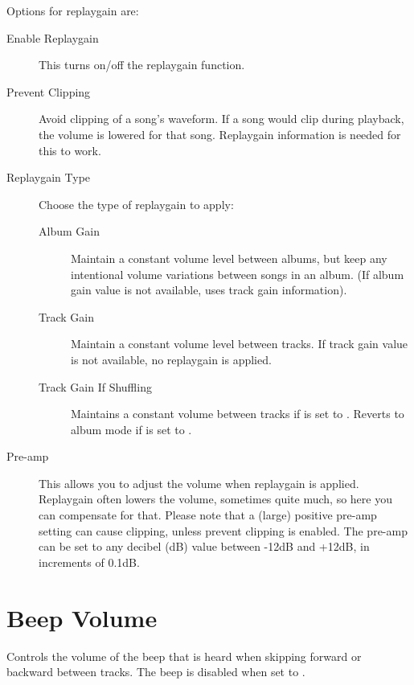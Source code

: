 {    Options for replaygain are:
    \begin{description}
      \item[Enable Replaygain]This turns on/off the replaygain function.
      \item[Prevent Clipping]Avoid clipping of a song's waveform.
        If a song would clip during playback, the volume is lowered for 
        that song. Replaygain information is needed for this to work.
      \item[Replaygain Type]Choose the type of replaygain to apply:
        \begin{description}
        \item[Album Gain]Maintain a constant volume level between
          albums, but keep any intentional volume variations between 
          songs in an album. (If album gain value is not available,
          uses track gain information).
        \item[Track Gain]Maintain a constant volume level between
          tracks. If track gain value is not available, no replaygain 
          is applied.
        \item[Track Gain If Shuffling]Maintains a constant volume
          between tracks if  is set to .
          Reverts to album mode if  is set to .
        \end{description}
      \item[Pre-amp]This allows you to adjust the volume when replaygain
        is applied. Replaygain often lowers the volume, sometimes quite
        much, so here you can compensate for that. Please note that a
        (large) positive pre-amp setting can cause clipping, unless
        prevent clipping is enabled.  The pre-amp can be set to any
        decibel (dB) value between -12dB and +12dB, in increments of 0.1{}dB.
      \end{description}

  \section{Beep Volume}
    Controls the volume of the beep that is heard when
    skipping forward or backward between tracks. The beep is disabled when
    set to .
}%



